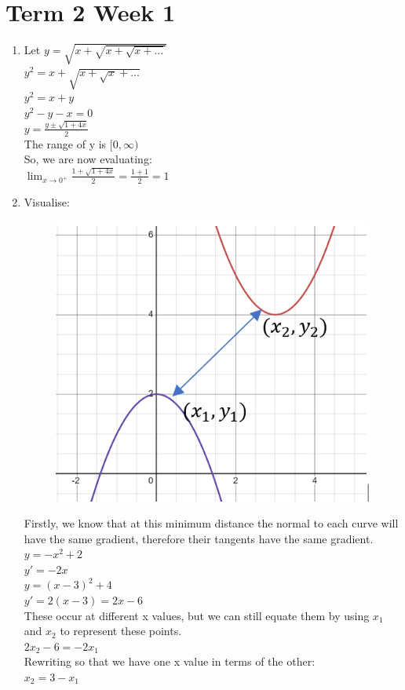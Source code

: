 \documentclass[../main.tex]{subfiles}
\begin{document}
\section*{Term 2 Week 1}
\begin{enumerate}
    \item 
    Let \(y=\sqrt{x+\sqrt{x+\sqrt{x+...}}}\)\\

    \(y^2=x+\sqrt{x+\sqrt{x}+...}\)\\

    \(y^2=x+y\)\\

    \(y^2-y-x=0\)\\

    \(y=\frac{y\pm \sqrt{1+4x}}{2}\)\\

    The range of y is \([0,\infty)\)\\
    So, we are now evaluating:\\
    \(\lim_{x\to0^+} \frac{1+\sqrt{1+4x}}{2}=\frac{1+1}{2}=1\)\\
    
    \item 
    Visualise:
    \begin{figure}[H]
        \centering
        \includegraphics[width=0.25\linewidth]{images/t2w1q2_a.png}
    \end{figure}
    Firstly, we know that at this minimum distance the normal to each curve will have the same gradient, therefore their tangents have the same gradient.\\
    \(y=-x^2+2\)\\
    \(y'=-2x\)\\

    \(y=(x-3)^2+4\)\\
    \(y'=2(x-3)=2x-6\)\\

    These occur at different x values, but we can still equate them by using \(x_1\) and \(x_2\) to represent these points.\\
    \(2x_2 -6=-2x_1\)\\

    Rewriting so that we have one x value in terms of the other:\\
    \(x_2=3-x_1\)\\


\end{enumerate}
\end{document}
